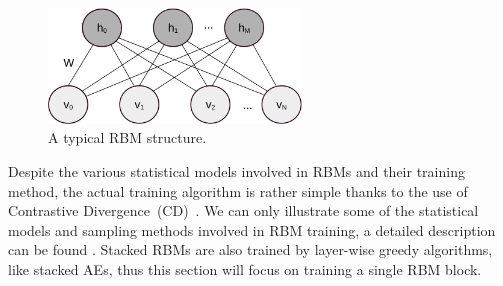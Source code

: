 \begin{figure}[hbt]
	\centering
	\includegraphics[width=0.6\textwidth]{pics_sdlm/rbm_o.pdf}
	\caption{A typical RBM structure.}
	\label{fig:RBM}
\end{figure}

Despite the various statistical models involved in RBMs and their training method, the actual training algorithm is rather simple thanks to the use of Contrastive Divergence~(CD)~\DIFdelbegin {}\DIFdelend \DIFaddbegin {}\DIFaddend .
We can only illustrate some of the statistical models and sampling methods involved in RBM training, a detailed description can be found \DIFdelbegin {}\DIFdelend \DIFaddbegin {}\DIFaddend . 
Stacked RBMs are also trained by layer-wise greedy algorithms, like stacked AEs, thus this section will focus on training a single RBM block.

